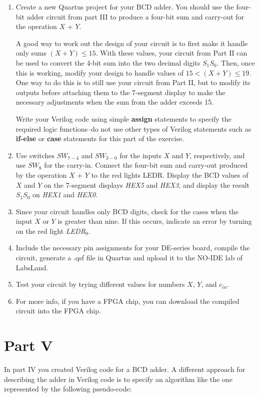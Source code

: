 \documentclass[epsfig,10pt,fullpage]{article}
\begin{document}
\begin{enumerate}
\item Create a new Quartus project for your BCD adder. You should use the
four-bit adder circuit from part III to produce a four-bit sum and carry-out for the
operation $X$ + $Y$. 

A good way to work out the design of your circuit is to first make it handle only sums
$(X + Y) \le 15$. With these values, your circuit from Part II can be used to convert the
4-bit sum into the two decimal digits $S_1 S_0$.  Then, once this is working, modify 
your design to handle values of $15 < (X + Y) \le 19$. One way to do this is to still use 
your circuit from Part II, but to modify its outputs before attaching them to the 7-segment 
display to make the necessary adjustments when the sum from the adder exceeds 15.

Write your Verilog code using
simple {\bf assign} statements to specify the required logic functions--do not use 
other types of Verilog
statements such as {\bf if-else} or {\bf case} statements for this part of the exercise.
\item Use switches $SW_{7-4}$ and $SW_{3-0}$ for the inputs $X$ and $Y$, respectively, and
use $SW_{8}$ for the carry-in. Connect the four-bit sum and carry-out produced 
by the operation $X$ + $Y$ to the red lights LEDR. Display the BCD values of $X$
and $Y$ on the 7-segment displays {\it HEX5} and {\it HEX3}, and display the result $S_1 S_0$ on
{\it HEX1} and {\it HEX0}.
\item Since your circuit handles only BCD digits, check for the cases when the input 
$X$ or $Y$ is greater than nine. If this occurs, indicate an error by turning on 
the red light {\it LEDR}$_9$.
\item Include the necessary pin assignments for your DE-series board, compile the circuit, generate a .qsf file in Quartus and upload it to the NO-IDE lab of LabsLand.
\item Test your circuit by trying different values for numbers $X$, $Y$, and $c_{in}$.
\item For more info, if you have a FPGA chip, you can download the compiled circuit into the FPGA chip.
\end{enumerate}

\section*{Part V}
In part IV you created Verilog code for a BCD adder. A different approach for describing
the adder in Verilog code is to specify an algorithm like the one
represented by the following pseudo-code:
\end{document}

